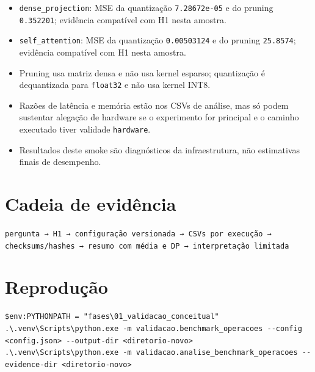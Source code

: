\begin{itemize}
\item \texttt{dense\_\allowbreak{}projection}: MSE da quantização \texttt{7.\allowbreak{}28672e-05} e do pruning \texttt{0.\allowbreak{}352201}; evidência compatível com H1 nesta amostra.
\item \texttt{self\_\allowbreak{}attention}: MSE da quantização \texttt{0.\allowbreak{}00503124} e do pruning \texttt{25.\allowbreak{}8574}; evidência compatível com H1 nesta amostra.
\item Pruning usa matriz densa e não usa kernel esparso; quantização é dequantizada para \texttt{float32} e não usa kernel INT8.
\item Razões de latência e memória estão nos CSVs de análise, mas só podem sustentar alegação de hardware se o experimento for principal e o caminho executado tiver validade \texttt{hardware}.
\item Resultados deste smoke são diagnósticos da infraestrutura, não estimativas finais de desempenho.
\end{itemize}


\section{Cadeia de evidência}



\texttt{pergunta → H1 → configuração versionada → CSVs por execução → checksums/\allowbreak{}hashes → resumo com média e DP → interpretação limitada}



\section{Reprodução}



\begin{Verbatim}[fontsize=\small,breaklines=true,label=powershell]
$env:PYTHONPATH = "fases\01_validacao_conceitual"
.\.venv\Scripts\python.exe -m validacao.benchmark_operacoes --config <config.json> --output-dir <diretorio-novo>
.\.venv\Scripts\python.exe -m validacao.analise_benchmark_operacoes --evidence-dir <diretorio-novo>
\end{Verbatim}
